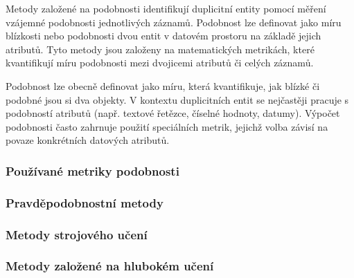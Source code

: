 Metody založené na podobnosti identifikují duplicitní entity pomocí měření vzájemné podobnosti jednotlivých záznamů. Podobnost lze definovat jako míru blízkosti nebo podobnosti dvou entit v datovém prostoru na základě jejich atributů. Tyto metody jsou založeny na matematických metrikách, které kvantifikují míru podobnosti mezi dvojicemi atributů či celých záznamů.

Podobnost lze obecně definovat jako míru, která kvantifikuje, jak blízké či podobné jsou si dva objekty. V kontextu duplicitních entit se nejčastěji pracuje s podobností atributů (např. textové řetězce, číselné hodnoty, datumy). Výpočet podobnosti často zahrnuje použití speciálních metrik, jejichž volba závisí na povaze konkrétních datových atributů.

\subsubsection{Používané metriky podobnosti}


\subsubsection {Pravděpodobnostní metody}

\subsubsection {Metody strojového učení}

\subsubsection {Metody založené na hlubokém učení}

